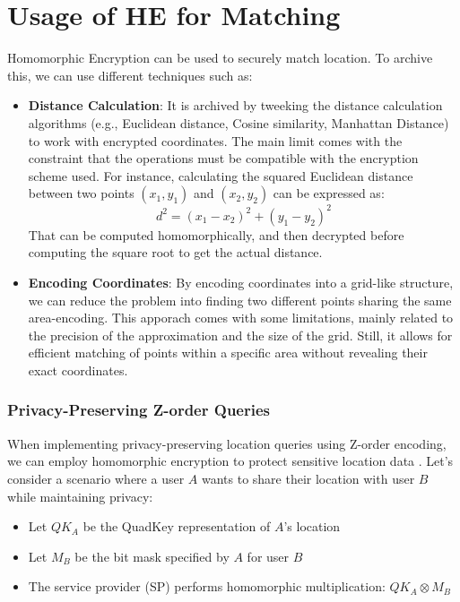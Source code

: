 \documentclass[12pt,a4paper,twoside]{book}
\begin{document}
\section{Usage of HE for Matching}
Homomorphic Encryption can be used to securely match location. To archive this, we can use different techniques such as:
\begin{itemize}
    \item \textbf{Distance Calculation}: It is archived by tweeking the distance calculation algorithms (e.g., Euclidean distance, Cosine similarity, Manhattan Distance) to work with encrypted coordinates. The main limit comes with the constraint that the operations must be compatible with the encryption scheme used. For instance, calculating the squared Euclidean distance between two points \( (x_1, y_1) \) and \( (x_2, y_2) \) can be expressed as:
    \[
        d^2 = (x_1 - x_2)^2 + (y_1 - y_2)^2
    \]
    That can be computed homomorphically, and then decrypted before computing the square root to get the actual distance.
    \item \textbf{Encoding Coordinates}: By encoding coordinates into a grid-like structure, we can reduce the problem into finding two different points sharing the same area-encoding. This apporach comes with some limitations, mainly related to the precision of the approximation and the size of the grid. Still, it allows for efficient matching of points within a specific area without revealing their exact coordinates.
\end{itemize}

\subsubsection{Privacy-Preserving Z-order Queries}
When implementing privacy-preserving location queries using Z-order encoding, we can employ homomorphic encryption to protect sensitive location data \cite{zhang2020privacy}. Let's consider a scenario where a user \( A \) wants to share their location with user \( B \) while maintaining privacy:

\begin{itemize}
    \item Let \( QK_A \) be the QuadKey representation of \( A \)'s location
    \item Let \( M_B \) be the bit mask specified by \( A \) for user \( B \)
    \item The service provider (SP) performs homomorphic multiplication: \( QK_A \otimes M_B \)
\end{itemize}
\end{document}
